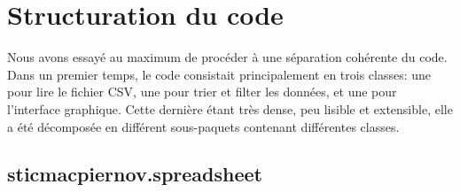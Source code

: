 \documentclass{article}
\begin{document}
\section{Structuration du code}

Nous avons essayé au maximum de procéder à une séparation cohérente du code. Dans un premier temps, le code consistait principalement en trois classes: une pour lire le fichier CSV, une pour trier et filter les données, et une pour l'interface graphique. Cette dernière étant très dense, peu lisible et extensible, elle a été décomposée en différent sous-paquets contenant différentes classes.

\subsection{sticmacpiernov.spreadsheet}
\end{document}
